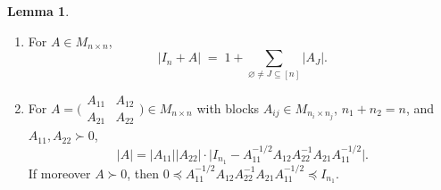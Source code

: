 \documentclass[12pt,a4paper]{article}
\theoremstyle{definition}
\newtheorem{lemma}[theorem]{Lemma}
\begin{document}
\begin{lemma}\label{lem:det}
  \leavevmode
  \begin{enumerate}[label=(\roman*),nosep]
    \item For $A\in M_{n\times n}$,
    \begin{equation}\label{eq:det1}
      |I_n+A|\;=\;1+\sum_{\varnothing\ne J\subseteq[n]}|A_J|.
    \end{equation}
    \item For $A=\bigl(\begin{smallmatrix}A_{11}&A_{12}\\A_{21}&A_{22}
      \end{smallmatrix}\bigr)\in M_{n\times n}$ with blocks
      $A_{ij}\in M_{n_i\times n_j}$, $n_1+n_2=n$, and $A_{11},A_{22}\succ 0$,
    \begin{equation}\label{eq:det2}
      |A|=|A_{11}||A_{22}|\cdot
      \bigl|I_{n_1}-A_{11}^{-1/2}A_{12}A_{22}^{-1}A_{21}A_{11}^{-1/2}\bigr|.
    \end{equation}
    If moreover $A\succ 0$, then
    $0\preccurlyeq A_{11}^{-1/2}A_{12}A_{22}^{-1}A_{21}
    A_{11}^{-1/2}\preccurlyeq I_{n_1}$.
  \end{enumerate}
\end{lemma}
\end{document}
